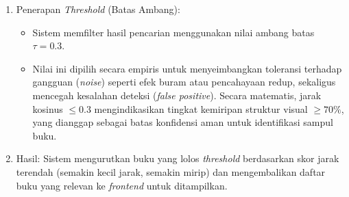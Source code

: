 \documentclass[12pt,a4paper]{article}
\begin{document}
\begin{enumerate}
\begin{itemize}
    \end{itemize}
    \item Penerapan \textit{Threshold} (Batas Ambang):
    \begin{itemize}
        \item Sistem memfilter hasil pencarian menggunakan nilai ambang batas $\tau = 0.3$.
        \item Nilai ini dipilih secara empiris untuk menyeimbangkan toleransi terhadap gangguan (\textit{noise}) seperti efek buram atau pencahayaan redup, sekaligus mencegah kesalahan deteksi (\textit{false positive}). Secara matematis, jarak kosinus $\leq 0.3$ mengindikasikan tingkat kemiripan struktur visual $\geq 70\%$, yang dianggap sebagai batas konfidensi aman untuk identifikasi sampul buku.
    \end{itemize}
    \item Hasil: Sistem mengurutkan buku yang lolos \textit{threshold} berdasarkan skor jarak terendah (semakin kecil jarak, semakin mirip) dan mengembalikan daftar buku yang relevan ke \textit{frontend} untuk ditampilkan.
\end{enumerate}
\end{document}
